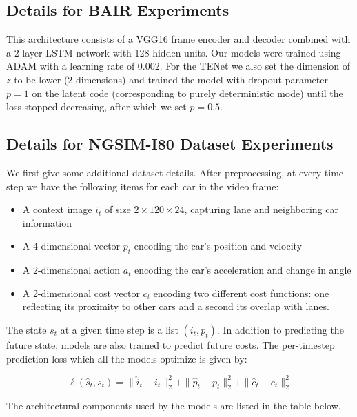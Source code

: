 \documentclass{article}
\newcommand{\modelname}{TENet }
\begin{document}
\subsection{Details for BAIR Experiments}
\label{bair-details}

This architecture consists of a VGG16 frame encoder and decoder combined with a 2-layer LSTM network with 128 hidden units.
Our models were trained using ADAM \citep{ADAM} with a learning rate of 0.002.
For the \modelname we also set the dimension of $z$ to be lower (2 dimensions) and trained the model with dropout parameter $p=1$ on the latent code (corresponding to purely deterministic mode) until the loss stopped decreasing, after which we set $p=0.5$.




\subsection{Details for NGSIM-I80 Dataset Experiments}

We first give some additional dataset details.
After preprocessing, at every time step we have the following items for each car in the video frame:


\begin{itemize}
\item A context image $i_t$ of size $2 \times 120 \times 24$, capturing lane and neighboring car information
\item A 4-dimensional vector $p_t$ encoding the car's position and velocity
\item A 2-dimensional action $a_t$ encoding the car's acceleration and change in angle
\item A 2-dimensional cost vector $c_t$ encoding two different cost functions: one reflecting its proximity to other cars and a second its overlap with lanes.
\end{itemize}

The state $s_t$ at a given time step is a list $(i_t, p_t)$. In addition to predicting the future state, models are also trained to predict future costs.
The per-timestep prediction loss which all the models optimize is given by:

\begin{equation}
\ell(\hat{s}_t, s_t) = \|\hat{i}_t - i_t \|_2^2 + \| \hat{p}_t - p_t \|_2^2 + \| \hat{c}_t - c_t \|_2^2
\end{equation}

The architectural components used by the models are listed in the table below.
\end{document}
